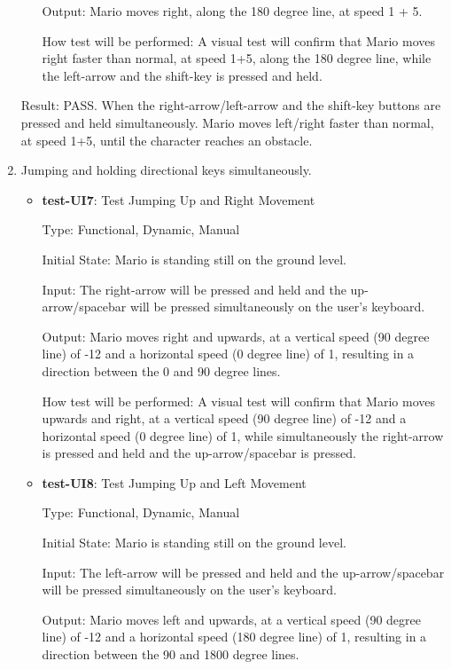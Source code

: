 \documentclass[12pt, titlepage]{article}
\begin{document}
\begin{enumerate}
\begin{itemize}
Output: Mario moves right, along the 180 degree line, at speed 1 + 5.
					
How test will be performed: A visual test will confirm that Mario moves right faster than normal, at speed 1+5, along the 180 degree line, while the left-arrow and the shift-key is pressed and held.

\end{itemize}

Result: PASS. When the right-arrow/left-arrow and the shift-key buttons are pressed and held simultaneously. Mario moves left/right faster than normal, at speed 1+5, until the character reaches an obstacle.

\item Jumping and holding directional keys simultaneously.
\begin{itemize}

\item{\textbf{test-UI7}: Test Jumping Up and Right Movement\\}

Type: Functional, Dynamic, Manual
					
Initial State: Mario is standing still on the ground level.
					
Input: The right-arrow will be pressed and held and the up-arrow/spacebar will be pressed simultaneously on the user's keyboard.
					
Output: Mario moves right and upwards, at a vertical speed (90 degree line) of -12 and a horizontal speed (0 degree line) of 1, resulting in a direction between the 0 and 90 degree lines.
					
How test will be performed: A visual test will confirm that Mario moves upwards and right, at a vertical speed (90 degree line) of -12 and a horizontal speed (0 degree line) of 1, while simultaneously the right-arrow is pressed and held and the up-arrow/spacebar is pressed.

\item{\textbf{test-UI8}: Test Jumping Up and Left Movement\\}

Type: Functional, Dynamic, Manual
					
Initial State: Mario is standing still on the ground level.
					
Input: The left-arrow will be pressed and held and the up-arrow/spacebar will be pressed simultaneously on the user's keyboard.
					
Output: Mario moves left and upwards, at a vertical speed (90 degree line) of -12 and a horizontal speed (180 degree line) of 1, resulting in a direction between the 90 and 1800 degree lines.
					

\end{itemize}
\end{enumerate}
\end{document}
